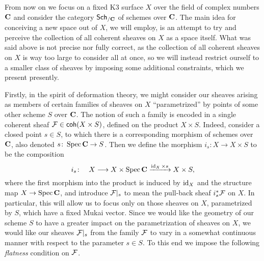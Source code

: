 From now on we focus on a fixed K3 surface $X$ over the field of complex numbers $\mathbf C$ and consider the category $\mathsf{Sch}_{/\mathbf C}$ of schemes over $\mathbf C$. The main idea for conceiving a new space out of $X$, we will employ, is an attempt to try and perceive the collection of all coherent sheaves on $X$ as a space itself. What was said above is not precise nor fully correct, as the collection of all coherent sheaves on $X$ is way too large to consider all at once, so we will instead restrict ourself to a smaller class of sheaves by imposing some additional constraints, which we present presently. 

Firstly, in the spirit of deformation theory, we might consider our sheaves arising as members of certain families of sheaves on $X$ ``parametrized'' by points of some other scheme $S$ over $\mathbf C$. The notion of such a family is encoded in a single coherent sheaf $\mathcal F \in \mathsf{coh}(X \times S)$, defined on the product $X \times S$. Indeed, consider a closed point $s \in S$, to which there is a corresponding morphism of schemes over $\mathbf C$, also denoted $s \colon \operatorname{Spec}\mathbf C \to S$. Then we define the morphism $i_s \colon X \to X \times S$ to be the composition
\begin{equation}
    \label{eq: inclusion of X to X x S}
    i_s \colon \quad X \longrightarrow X \times \operatorname{Spec}\mathbf C \xrightarrow{\operatorname{id}_{X} \times s} X \times S,
\end{equation}
where the first morphism into the product is induced by $\operatorname{id}_{X}$ and the structure map $X \to \operatorname{Spec}\mathbf C$, and introduce $\mathcal F|_s$ to mean the pull-back sheaf $i_s^*\mathcal F$ on $X$. In particular, this will allow us to focus only on those sheaves on $X$, parametrized by $S$, which have a fixed Mukai vector.
Since we would like the geometry of our scheme $S$ to have a greater impact on the parametrization of sheaves on $X$, we would like our sheaves $\mathcal F|_s$ from the family $\mathcal F$ to vary in a somewhat continuous manner with respect to the parameter $s \in S$. To this end we impose the following \emph{flatness} condition on $\mathcal F$. 

